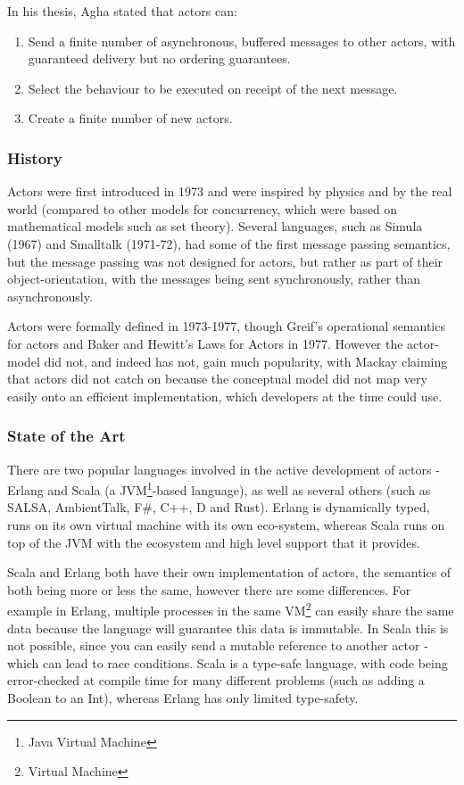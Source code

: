 \documentclass[pdftex,12pt,a4paper]{article}
\begin{document}
In his thesis, Agha\cite{agha1985} stated that actors can:
\begin{enumerate}[noitemsep]
\item Send a finite number of asynchronous, buffered messages to other actors, with guaranteed delivery but no ordering guarantees.
\item Select the behaviour to be executed on receipt of the next message.
\item Create a finite number of new actors.
\end{enumerate}

\subsubsection{History}

Actors were first introduced in 1973\cite{hewitt1973} and were inspired by physics and by the real world\cite{hewitt2006} (compared to other models for concurrency, which were based on mathematical models such as set theory\cite{Milner:1993:EIT:151233.151240}).
Several languages, such as Simula (1967) and Smalltalk (1971-72), had some of the first message passing semantics, but the message passing was not designed for actors, but rather as part of their object-orientation, with the messages being sent synchronously, rather than asynchronously.

Actors were formally defined in 1973-1977, though Greif's operational semantics for actors\cite{grief1975} and Baker and Hewitt's Laws for Actors in 1977\cite{hewitt1977}.
However the actor-model did not, and indeed has not, gain much popularity, with Mackay\cite{mackay97} claiming that actors did not catch on because the conceptual model did not map very easily onto an efficient implementation, which developers at the time could use.

\subsubsection{State of the Art}

There are two popular languages involved in the active development of actors - Erlang and Scala (a JVM\footnote{Java Virtual Machine}-based language), as well as several others (such as SALSA, AmbientTalk, F\#, C++, D and Rust).
Erlang is dynamically typed, runs on its own virtual machine with its own eco-system, whereas Scala runs on top of the JVM with the ecosystem and high level support that it provides.

Scala and Erlang both have their own implementation of actors, the semantics of both being more or less the same, however there are some differences. 
For example in Erlang, multiple processes in the same VM\footnote{Virtual Machine} can easily share the same data because the language will guarantee this data is immutable.
In Scala this is not possible, since you can easily send a mutable reference to another actor - which can lead to race conditions\cite{akka-mutable}.
Scala is a type-safe language, with code being error-checked at compile time for many different problems (such as adding a Boolean to an Int), whereas Erlang has only limited type-safety.
\end{document}
